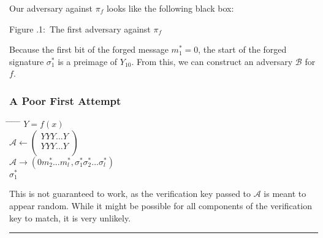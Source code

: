 \documentclass[twoside]{article}
\newcounter{lecnum}
\newcommand{\fig}[3]{
            \vspace{#2}
            \begin{center}
            Figure \thelecnum.#1:~#3
            \end{center}
    }
\newenvironment{proof}{{\bf Proof:}}{\hfill\rule{2mm}{2mm}}
\begin{document}
\begin{proof}
Our adversary against $\pi_f$ looks like the following black box:

\begin{center}
\end{center}
\fig{1}{0in}{The first adversary against $\pi_f$}

Because the first bit of the forged message $m^*_1 = 0$, the start of the forged signature $\sigma^*_1$ is a preimage of $Y_{10}$. From this, we can construct an adversary $\mathcal{B}$ for $f$.

\subsubsection{A Poor First Attempt}

\begin{tabbing}
\hspace*{.25in} \= \hspace*{.25in} \= \hspace*{.25in} \= \hspace*{.25in} \= \hspace*{.25in} \=\kill
{} $Y = f(x)$\\
\>$\mathcal{A} \leftarrow
\begin{pmatrix}
YYY...Y\\
YYY...Y\\
\end{pmatrix}$\\
\>$\mathcal{A} \rightarrow (0m^*_2...m^*_l,\sigma^*_1\sigma^*_2...\sigma^*_l)$\\
 $\sigma^*_1$
\end{tabbing}

This is not guaranteed to work, as the verification key passed to $\mathcal{A}$ is meant to appear random. While it might be possible for all components of the verification key to match, it is very unlikely.


\end{proof}
\end{document}
